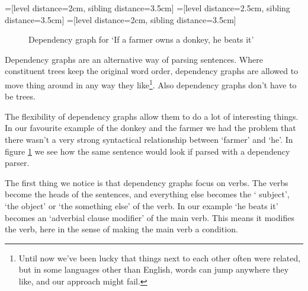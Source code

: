 \documentclass[12pt]{article}
\begin{document}
=[level distance=2cm, sibling distance=3.5cm]
=[level distance=2.5cm, sibling distance=3.5cm]
=[level distance=2cm, sibling distance=3.5cm]
\begin{figure}
\centering
{}
\caption{Dependency graph for `If a farmer owns a donkey, he beats it'} \label{fig:dependency_graph}
\end{figure}

Dependency graphs are an alternative way of parsing sentences. Where constituent trees keep the original word order, dependency graphs are allowed to move thing around in any way they like\footnote{Until now we've been lucky that things next to each other often were related, but in some languages other than English, words can jump anywhere they like, and our approach might fail.}. Also dependency graphs don't have to be trees.

The flexibility of dependency graphs allow them to do a lot of interesting things. In our favourite example of the donkey and the farmer we had the problem that there wasn't a very strong syntactical relationship between `farmer' and `he'. In figure \ref{fig:dependency_graph} we see how the same sentence would look if parsed with a dependency parser.

The first thing we notice is that dependency graphs focus on verbs. The verbs become the heads of the sentences, and everything else becomes the ` subject', `the object' or `the something else' of the verb. In our example `he beats it' becomes an `adverbial clause modifier' of the main verb. This means it modifies the verb, here in the sense of making the main verb a condition.
\end{document}
